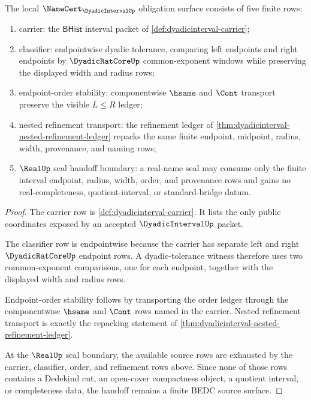 \begin{theorem}
\label{thm:dyadicinterval-namecert-obligation}
The local $\NameCert_{\DyadicIntervalUp}$ obligation surface consists of five
finite rows:
\begin{enumerate}
\item carrier: the $\mathsf{BHist}$ interval packet of
\autoref{def:dyadicinterval-carrier};
\item classifier: endpointwise dyadic tolerance, comparing left endpoints
and right endpoints by $\DyadicRatCoreUp$ common-exponent windows while
preserving the displayed width and radius rows;
\item endpoint-order stability: componentwise $\hsame$ and $\Cont$
transport preserve the visible $L\leq R$ ledger;
\item nested refinement transport: the refinement ledger of
\autoref{thm:dyadicinterval-nested-refinement-ledger} repacks the same finite
endpoint, midpoint, radius, width, provenance, and naming rows;
\item $\RealUp$ seal handoff boundary: a real-name seal may consume only the
finite interval endpoint, radius, width, order, and provenance rows and gains
no real-completeness, quotient-interval, or standard-bridge datum.
\end{enumerate}
\end{theorem}
\begin{proof}
The carrier row is \autoref{def:dyadicinterval-carrier}. It lists the only
public coordinates exposed by an accepted $\DyadicIntervalUp$ packet.

The classifier row is endpointwise because the carrier has separate left and
right $\DyadicRatCoreUp$ endpoint rows. A dyadic-tolerance witness therefore
uses two common-exponent comparisons, one for each endpoint, together with
the displayed width and radius rows.

Endpoint-order stability follows by transporting the order ledger through
the componentwise $\hsame$ and $\Cont$ rows named in the carrier. Nested
refinement transport is exactly the repacking statement of
\autoref{thm:dyadicinterval-nested-refinement-ledger}.

At the $\RealUp$ seal boundary, the available source rows are exhausted by
the carrier, classifier, order, and refinement rows above. Since none of
those rows contains a Dedekind cut, an open-cover compactness object, a
quotient interval, or completeness data, the handoff remains a finite BEDC
source surface.
\end{proof}

